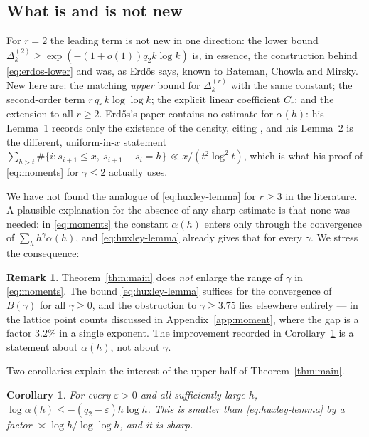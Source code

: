 \documentclass[11pt,reqno]{amsart}
\theoremstyle{plain}
\newtheorem{corollary}[theorem]{Corollary}
\theoremstyle{definition}
\newtheorem{remark}[theorem]{Remark}
\numberwithin{equation}{section}
\begin{document}
\subsection*{What is and is not new}
For $r=2$ the leading term is not new in one direction: the lower bound
$\Delta^{(2)}_k\ge\exp(-(1+o(1))q_2k\log k)$ is, in essence, the construction behind
\eqref{eq:erdos-lower} and was, as Erd\H{o}s says, known to Bateman, Chowla and Mirsky.
New here are: the matching \emph{upper} bound for $\Delta^{(r)}_k$ with the same constant;
the second-order term $r\,q_r\,k\log\log k$; the explicit linear coefficient $C_r$; and the
extension to all $r\ge2$. Erd\H{o}s's paper contains no estimate for $\alpha(h)$: his
Lemma~1 records only the existence of the density, citing \cite{Mirsky}, and his Lemma~2 is
the different, uniform-in-$x$ statement
$\sum_{h>t}\#\{i:s_{i+1}\le x,\ s_{i+1}-s_i=h\}\ll x/(t^{2}\log^{2}t)$, which is what his
proof of \eqref{eq:moments} for $\gamma\le2$ actually uses.

We have not found the analogue of \eqref{eq:huxley-lemma} for $r\ge3$ in the literature.
A plausible explanation for the absence of any sharp estimate is that none was needed: in
\eqref{eq:moments} the constant $\alpha(h)$ enters only through the convergence of
$\sum_hh^{\gamma}\alpha(h)$, and \eqref{eq:huxley-lemma} already gives that for every
$\gamma$. We stress the consequence:

\begin{remark}\label{rem:nogain}
Theorem~\ref{thm:main} does \emph{not} enlarge the range of $\gamma$ in
\eqref{eq:moments}. The bound \eqref{eq:huxley-lemma} suffices for the convergence of
$B(\gamma)$ for all $\gamma\ge0$, and the obstruction to $\gamma\ge3.75$ lies elsewhere
entirely --- in the lattice point counts discussed in Appendix~\ref{app:moment}, where the
gap is a factor $3.2\%$ in a single exponent. The improvement recorded in
Corollary~\ref{cor:huxley} is a statement about $\alpha(h)$, not about $\gamma$.
\end{remark}

Two corollaries explain the interest of the upper half of Theorem~\ref{thm:main}.

\begin{corollary}\label{cor:huxley}
For every $\varepsilon>0$ and all sufficiently large $h$,
$\log\alpha(h)\le-(q_2-\varepsilon)h\log h$. This is smaller than
\eqref{eq:huxley-lemma} by a factor $\asymp\log h/\log\log h$, and it is sharp.
\end{corollary}
\end{document}
